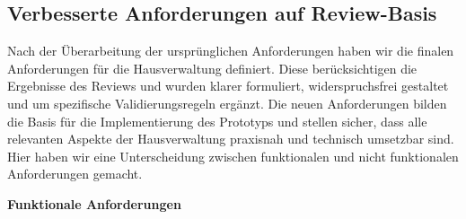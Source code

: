 \newpage
\subsection{Verbesserte Anforderungen auf Review-Basis}


Nach der Überarbeitung der ursprünglichen Anforderungen haben wir die finalen Anforderungen für die Hausverwaltung definiert.
Diese berücksichtigen die Ergebnisse des Reviews und wurden klarer formuliert, widerspruchsfrei gestaltet und um spezifische Validierungsregeln ergänzt.
Die neuen Anforderungen bilden die Basis für die Implementierung des Prototyps und stellen sicher,
dass alle relevanten Aspekte der Hausverwaltung praxisnah und technisch umsetzbar sind.
Hier haben wir eine Unterscheidung zwischen funktionalen und nicht funktionalen Anforderungen gemacht.

\footnotesize

\textbf{Funktionale Anforderungen}

